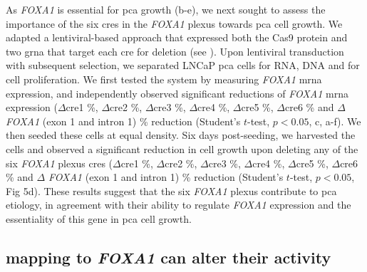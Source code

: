 As \emph{FOXA1} is essential for \gls{pca} growth (b-e), we next sought to assess the importance of the six \glspl{cre} in the \emph{FOXA1} plexus towards \gls{pca} cell growth.
We adapted a lentiviral-based approach that expressed both the Cas9 protein and two \gls{grna} that target each \gls{cre} for deletion (see ).
Upon lentiviral transduction with subsequent selection, we separated LNCaP \gls{pca} cells for RNA, DNA and for cell proliferation.
We first tested the system by measuring \emph{FOXA1} \gls{mrna} expression, and independently observed significant reductions of \emph{FOXA1} \gls{mrna} expression ($\Delta$\gls{cre}1 \%, $\Delta$\gls{cre}2 \%, $\Delta$\gls{cre}3 \%, $\Delta$\gls{cre}4 \%, $\Delta$\gls{cre}5 \%, $\Delta$\gls{cre}6 \% and $\Delta$ \emph{FOXA1} (exon 1 and intron 1) \% reduction (Student's $t$-test, $p<0.05$, c, a-f).
We then seeded these cells at equal density.
Six days post-seeding, we harvested the cells and observed a significant reduction in cell growth upon deleting any of the six \emph{FOXA1} plexus \glspl{cre} ($\Delta$\gls{cre}1 \%, $\Delta$\gls{cre}2 \%, $\Delta$\gls{cre}3 \%, $\Delta$\gls{cre}4 \%, $\Delta$\gls{cre}5 \%, $\Delta$\gls{cre}6 \% and $\Delta$ \emph{FOXA1} (exon 1 and intron 1) \% reduction (Student's $t$-test, $p<0.05$, Fig 5d).
These results suggest that the six \emph{FOXA1} plexus contribute to \gls{pca} etiology, in agreement with their ability to regulate \emph{FOXA1} expression and the essentiality of this gene in \gls{pca} cell growth.

\subsection{ mapping to \emph{FOXA1}  can alter their activity}

